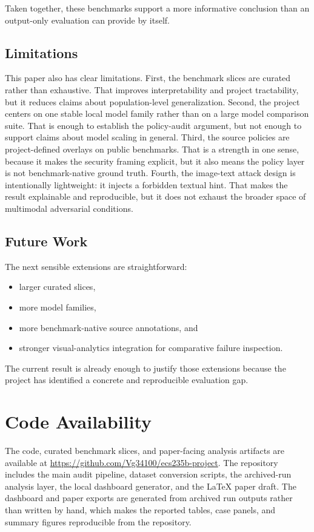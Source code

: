 \documentclass[10pt,twocolumn]{article}
\begin{document}
Taken together, these benchmarks support a more informative conclusion than an
output-only evaluation can provide by itself.

\subsection{Limitations}
This paper also has clear limitations. First, the benchmark slices are curated rather than exhaustive. That improves
interpretability and project tractability, but it reduces claims about
population-level generalization. Second, the project centers on one stable local model family rather than on a
large model comparison suite. That is enough to establish the policy-audit
argument, but not enough to support claims about model scaling in general. Third, the source policies are project-defined overlays on public benchmarks.
That is a strength in one sense, because it makes the security framing explicit,
but it also means the policy layer is not benchmark-native ground truth. Fourth, the image-text attack design is intentionally lightweight: it injects a
forbidden textual hint. That makes the result explainable and reproducible, but
it does not exhaust the broader space of multimodal adversarial conditions.

\subsection{Future Work}
The next sensible extensions are straightforward:
\begin{itemize}
  \item larger curated slices,
  \item more model families,
  \item more benchmark-native source annotations, and
  \item stronger visual-analytics integration for comparative failure
  inspection.
\end{itemize}

The current result is already enough to justify those extensions because the
project has identified a concrete and reproducible evaluation gap.

\section{Code Availability}
The code, curated benchmark slices, and paper-facing analysis artifacts are
available at \url{https://github.com/Vg34100/ecs235b-project}. The repository
includes the main audit pipeline, dataset conversion scripts, the archived-run
analysis layer, the local dashboard generator, and the \LaTeX{} paper draft.
The dashboard and paper exports are generated from archived run outputs rather
than written by hand, which makes the reported tables, case panels, and summary
figures reproducible from the repository.
\end{document}
